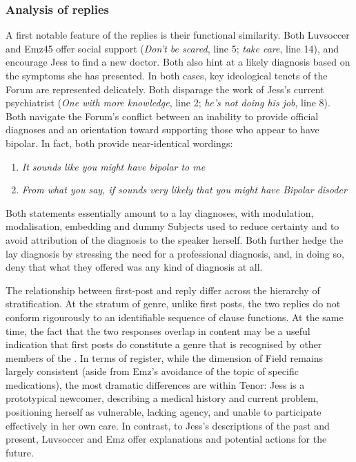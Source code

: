\subsubsection{Analysis of replies} \label{sect:qual-reply-analysis}

A first notable feature of the replies is their functional similarity. Both Luvsoccer and Emz45 offer social support (\emph{Don't be scared}, line 5; \emph{take care}, line 14), and encourage Jess to find a new doctor. Both also hint at a likely diagnosis based on the symptoms she has presented. In both cases, key ideological tenets of the \gls{Forum} are represented delicately. Both disparage the work of Jess's current psychiatrist (\emph{One with more knowledge}, line 2; \emph{he's not doing his job}, line 8). Both navigate the \gls{Forum}'s conflict between an inability to provide official diagnoses and an orientation toward supporting those who appear to have \gls{bipolar}. In fact, both provide near\hyp{}identical wordings:

\begin{enumerate}
\item \emph{It sounds like you might have bipolar to me}
\item \emph{From what you say, if sounds very likely that you might have Bipolar disoder}
\end{enumerate}
%
Both statements essentially amount to a lay diagnoses, with modulation, modalisation, embedding and dummy Subjects used to reduce certainty and to avoid attribution of the diagnosis to the speaker herself. Both further hedge the lay diagnosis by stressing the need for a professional diagnosis, and, in doing so, deny that what they offered was any kind of diagnosis at all.

The relationship between first\hyp{}\gls{post} and reply differ across the hierarchy of stratification. At the stratum of genre, unlike first \glspl{post}, the two replies do not conform rigourously to an identifiable sequence of clause functions. At the same time, the fact that the two responses overlap in content may be a useful indication that first \glspl{post} do constitute a genre that is recognised by other \glspl{member} of the . In terms of register, while the dimension of Field remains largely consistent (aside from Emz's avoidance of the topic of specific medications), the most dramatic differences are within Tenor: Jess is a prototypical newcomer, describing a medical history and current problem, positioning herself as vulnerable, lacking agency, and unable to participate effectively in her own care. In contrast, to Jess's descriptions of the past and present, Luvsoccer and Emz offer explanations and potential actions for the future. 

